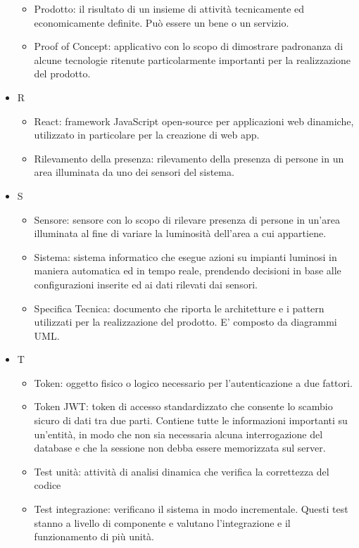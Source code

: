 \documentclass[12pt]{article}
\begin{document}
\begin{itemize}
\begin{itemize}
        \item Prodotto: il risultato di un insieme di attività tecnicamente ed economicamente definite. Può essere un bene o un servizio.
        \item Proof of Concept: applicativo con lo scopo di dimostrare padronanza di alcune tecnologie ritenute particolarmente importanti per la realizzazione del prodotto.
    \end{itemize}
    \item[] R
    \begin{itemize}
        \item React: framework JavaScript open-source per applicazioni web dinamiche, utilizzato in particolare per la creazione di web app.
        \item Rilevamento della presenza: rilevamento della presenza di persone in un area illuminata da uno dei sensori del sistema.
    \end{itemize}
    \item[] S
    \begin{itemize}
        \item Sensore: sensore con lo scopo di rilevare presenza di persone in un’area illuminata al fine di variare la luminosità dell’area a cui appartiene.
        \item Sistema: sistema informatico che esegue azioni su impianti luminosi in maniera automatica ed in tempo reale, prendendo decisioni in base alle configurazioni inserite ed ai dati rilevati dai sensori.
        \item Specifica Tecnica: documento che riporta le architetture e i pattern utilizzati per la realizzazione del prodotto. E' composto da diagrammi UML.
    \end{itemize}
    \item[] T
    \begin{itemize}
        \item Token: oggetto fisico o logico necessario per l'autenticazione a due fattori.
        \item Token JWT:  token di accesso standardizzato che consente lo scambio sicuro di dati tra due parti. Contiene tutte le informazioni importanti su un’entità, in modo che non sia necessaria alcuna interrogazione del database e che la sessione non debba essere memorizzata sul server.
        \item Test unità:  attività di analisi dinamica che verifica la correttezza del codice
        \item Test integrazione: verificano il sistema in modo incrementale. Questi test stanno a livello di componente e valutano l'integrazione e il funzionamento di più unità.

\end{itemize}
\end{itemize}
\end{document}
